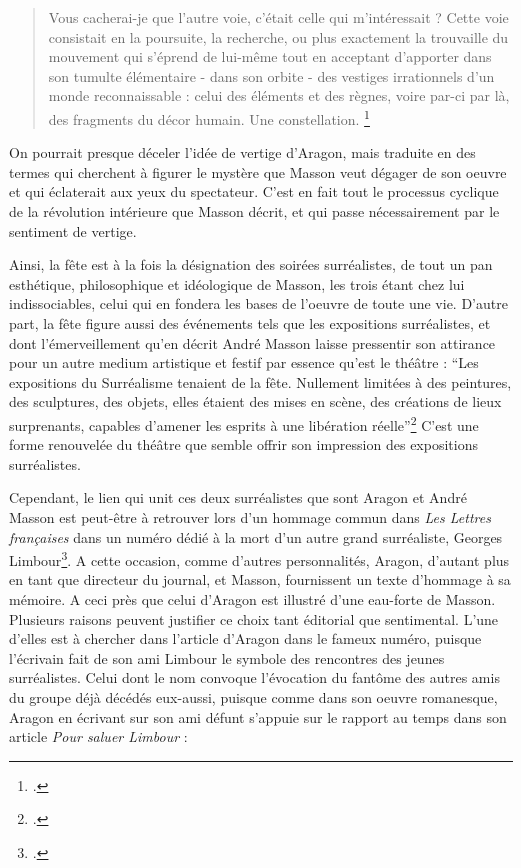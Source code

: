\begin{quote}
Vous cacherai-je que l’autre voie, c’était celle qui m’intéressait ? Cette voie consistait en la poursuite, la recherche, ou plus exactement la trouvaille du mouvement qui s’éprend de lui-même tout en acceptant d’apporter dans son tumulte élémentaire - dans son orbite - des vestiges irrationnels d’un monde reconnaissable : celui des éléments et des règnes, voire par-ci par là, des fragments du décor humain. Une constellation. 	
\footcite[p34]{rebelle}\end{quote}


	On pourrait presque déceler l’idée de vertige d’Aragon, mais traduite en des termes qui cherchent à figurer le mystère que Masson veut dégager de son oeuvre et qui éclaterait aux yeux du spectateur. C’est en fait tout le processus cyclique de la révolution intérieure que Masson décrit, et qui passe nécessairement par le sentiment de vertige. 

	Ainsi, la fête est à la fois la désignation des soirées surréalistes, de tout un pan esthétique, philosophique et idéologique de Masson, les trois étant chez lui indissociables, celui qui en fondera les bases de l’oeuvre de toute une vie. D’autre part, la fête figure aussi des événements tels que les expositions surréalistes, et dont l’émerveillement qu’en décrit André Masson laisse pressentir son attirance pour un autre medium artistique et festif par essence qu’est le théâtre : \enquote{Les expositions du Surréalisme tenaient de la fête. Nullement limitées à des peintures, des sculptures, des objets, elles étaient des mises en scène, des créations de lieux surprenants, capables d’amener les esprits à une libération réelle}\footcite[p41]{memoiremonde} C’est une forme renouvelée du théâtre que semble offrir son impression des expositions surréalistes. 
	
	Cependant, le lien qui unit ces deux surréalistes que sont Aragon et André Masson est peut-être à retrouver lors d’un hommage commun dans \emph{Les Lettres françaises} dans un numéro dédié à la mort d’un autre grand surréaliste, Georges Limbour\footcite[]{journallimbour}. A cette occasion, comme d’autres personnalités, Aragon, d’autant plus en tant que directeur du journal, et Masson, fournissent un texte d’hommage à sa mémoire. A ceci près que celui d’Aragon est illustré d’une eau-forte de Masson. Plusieurs raisons peuvent justifier ce choix tant éditorial que sentimental. L’une d’elles est à chercher dans l’article d’Aragon dans le fameux numéro, puisque l’écrivain fait de son ami Limbour le symbole des rencontres des jeunes surréalistes. Celui dont le nom convoque l’évocation du fantôme des autres amis du groupe déjà décédés eux-aussi, puisque comme dans son oeuvre romanesque, Aragon en écrivant sur son ami défunt s’appuie sur le rapport au temps dans son article \emph{Pour saluer Limbour} : 


